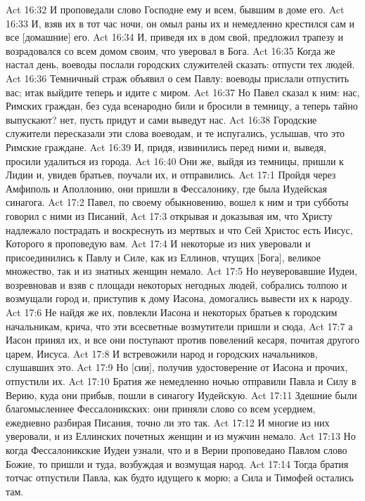Act 16:32  И проповедали слово Господне ему и всем, бывшим в доме его.
Act 16:33  И, взяв их в тот час ночи, он омыл раны их и немедленно крестился сам и все [домашние] его.
Act 16:34  И, приведя их в дом свой, предложил трапезу и возрадовался со всем домом своим, что уверовал в Бога.
Act 16:35  Когда же настал день, воеводы послали городских служителей сказать: отпусти тех людей.
Act 16:36  Темничный страж объявил о сем Павлу: воеводы прислали отпустить вас; итак выйдите теперь и идите с миром.
Act 16:37  Но Павел сказал к ним: нас, Римских граждан, без суда всенародно били и бросили в темницу, а теперь тайно выпускают? нет, пусть придут и сами выведут нас.
Act 16:38  Городские служители пересказали эти слова воеводам, и те испугались, услышав, что это Римские граждане.
Act 16:39  И, придя, извинились перед ними и, выведя, просили удалиться из города.
Act 16:40  Они же, выйдя из темницы, пришли к Лидии и, увидев братьев, поучали их, и отправились.
Act 17:1  Пройдя через Амфиполь и Аполлонию, они пришли в Фессалонику, где была Иудейская синагога.
Act 17:2  Павел, по своему обыкновению, вошел к ним и три субботы говорил с ними из Писаний,
Act 17:3  открывая и доказывая им, что Христу надлежало пострадать и воскреснуть из мертвых и что Сей Христос есть Иисус, Которого я проповедую вам.
Act 17:4  И некоторые из них уверовали и присоединились к Павлу и Силе, как из Еллинов, чтущих [Бога], великое множество, так и из знатных женщин немало.
Act 17:5  Но неуверовавшие Иудеи, возревновав и взяв с площади некоторых негодных людей, собрались толпою и возмущали город и, приступив к дому Иасона, домогались вывести их к народу.
Act 17:6  Не найдя же их, повлекли Иасона и некоторых братьев к городским начальникам, крича, что эти всесветные возмутители пришли и сюда,
Act 17:7  а Иасон принял их, и все они поступают против повелений кесаря, почитая другого царем, Иисуса.
Act 17:8  И встревожили народ и городских начальников, слушавших это.
Act 17:9  Но [сии], получив удостоверение от Иасона и прочих, отпустили их.
Act 17:10  Братия же немедленно ночью отправили Павла и Силу в Верию, куда они прибыв, пошли в синагогу Иудейскую.
Act 17:11  Здешние были благомысленнее Фессалоникских: они приняли слово со всем усердием, ежедневно разбирая Писания, точно ли это так.
Act 17:12  И многие из них уверовали, и из Еллинских почетных женщин и из мужчин немало.
Act 17:13  Но когда Фессалоникские Иудеи узнали, что и в Верии проповедано Павлом слово Божие, то пришли и туда, возбуждая и возмущая народ.
Act 17:14  Тогда братия тотчас отпустили Павла, как будто идущего к морю; а Сила и Тимофей остались там.

